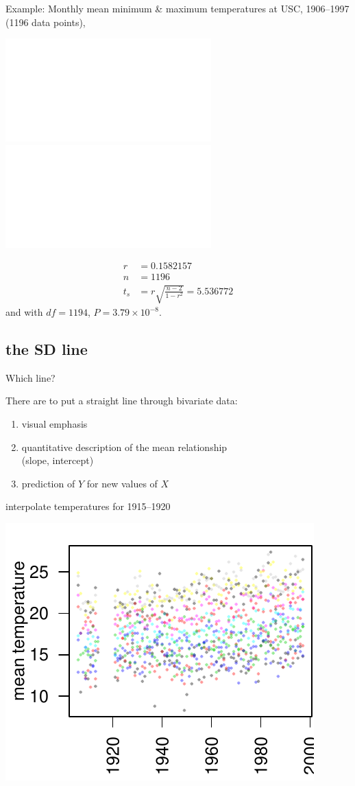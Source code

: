 \begin{frame}{Example:}
    Monthly mean minimum \& maximum temperatures
    at USC, 1906--1997  (1196 data points),
    \begin{center}
    \includegraphics<1>{usc-temps.pdf}
    \includegraphics<2>{usc-temps-stdized.pdf}
    \end{center}

    \pause
    \vspace{2em}

    \begin{align*}
        r&=0.1582157 \\
        n&=1196 \\
        t_s &= r \sqrt{\frac{n-2}{1-r^2}} = 5.536772 
    \end{align*}
    and with $df=1194$, $P=3.79\times 10^{-8}$.

\end{frame}

\subsection{the SD line}

\begin{frame}{Which line?}

    There are  to put a straight line through bivariate data:
    \begin{enumerate}
        \item visual emphasis
        \item quantitative description of the mean relationship \\
            (slope, intercept)
        \item prediction of $Y$ for new values of $X$
    \end{enumerate}


    \vspace{2em}

     interpolate temperatures for 1915--1920
    \begin{center}
    \includegraphics[width=.5\textwidth]{usc-temps.pdf}
    \end{center}

\end{frame}


